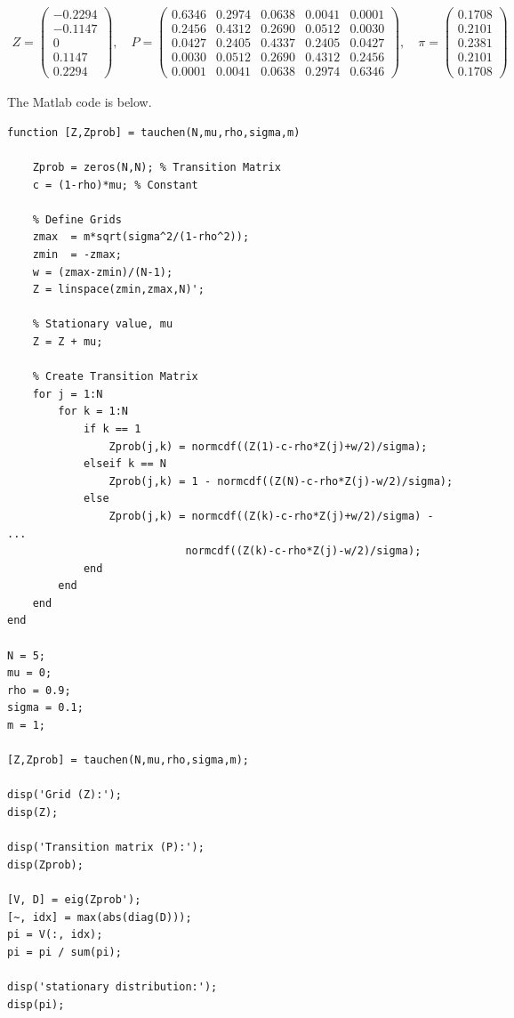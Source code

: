 \documentclass{ltjsarticle}
\begin{document}
\begin{gather*}
    Z = \begin{pmatrix}
        -0.2294\\
        -0.1147\\
              0\\
         0.1147\\
         0.2294
    \end{pmatrix}
    , \quad
    P = \begin{pmatrix}
        0.6346  &  0.2974  &  0.0638  &  0.0041  &  0.0001\\
        0.2456  &  0.4312  &  0.2690  &  0.0512  &  0.0030\\
        0.0427  &  0.2405  &  0.4337  &  0.2405  &  0.0427\\
        0.0030  &  0.0512  &  0.2690  &  0.4312  &  0.2456\\
        0.0001  &  0.0041  &  0.0638  &  0.2974  &  0.6346
    \end{pmatrix}
    , \quad
    \pi = \begin{pmatrix}
        0.1708\\
        0.2101\\
        0.2381\\
        0.2101\\
        0.1708
    \end{pmatrix}
\end{gather*}

The Matlab code is below.
\lstset{style=matlab}
\begin{lstlisting}
function [Z,Zprob] = tauchen(N,mu,rho,sigma,m)

    Zprob = zeros(N,N); % Transition Matrix
    c = (1-rho)*mu; % Constant

    % Define Grids 
    zmax  = m*sqrt(sigma^2/(1-rho^2));
    zmin  = -zmax;
    w = (zmax-zmin)/(N-1);
    Z = linspace(zmin,zmax,N)';

    % Stationary value, mu
    Z = Z + mu;

    % Create Transition Matrix
    for j = 1:N
        for k = 1:N
            if k == 1
                Zprob(j,k) = normcdf((Z(1)-c-rho*Z(j)+w/2)/sigma);
            elseif k == N
                Zprob(j,k) = 1 - normcdf((Z(N)-c-rho*Z(j)-w/2)/sigma);
            else
                Zprob(j,k) = normcdf((Z(k)-c-rho*Z(j)+w/2)/sigma) - ...
                            normcdf((Z(k)-c-rho*Z(j)-w/2)/sigma);
            end
        end
    end
end

N = 5;
mu = 0;
rho = 0.9;
sigma = 0.1;
m = 1;

[Z,Zprob] = tauchen(N,mu,rho,sigma,m);

disp('Grid (Z):');
disp(Z);

disp('Transition matrix (P):');
disp(Zprob);

[V, D] = eig(Zprob');
[~, idx] = max(abs(diag(D)));
pi = V(:, idx); 
pi = pi / sum(pi);

disp('stationary distribution:');
disp(pi);
\end{lstlisting}
\end{document}
